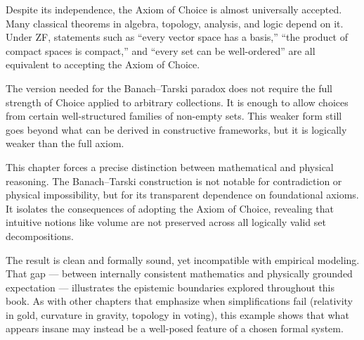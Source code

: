 Despite its independence, the Axiom of Choice is almost universally accepted. Many classical theorems in algebra, topology, analysis, and logic depend on it. Under ZF, statements such as “every vector space has a basis,” “the product of compact spaces is compact,” and “every set can be well-ordered” are all equivalent to accepting the Axiom of Choice.

The version needed for the Banach–Tarski paradox does not require the full strength of Choice applied to arbitrary collections. It is enough to allow choices from certain well-structured families of non-empty sets. This weaker form still goes beyond what can be derived in constructive frameworks, but it is logically weaker than the full axiom.

\begin{commentary}[Commentary]
This chapter forces a precise distinction between mathematical and physical reasoning. The Banach–Tarski construction is not notable for contradiction or physical impossibility, but for its transparent dependence on foundational axioms. It isolates the consequences of adopting the Axiom of Choice, revealing that intuitive notions like volume are not preserved across all logically valid set decompositions.

The result is clean and formally sound, yet incompatible with empirical modeling. That gap — between internally consistent mathematics and physically grounded expectation — illustrates the epistemic boundaries explored throughout this book. As with other chapters that emphasize when simplifications fail (relativity in gold, curvature in gravity, topology in voting), this example shows that what appears insane may instead be a well-posed feature of a chosen formal system.

\end{commentary}

